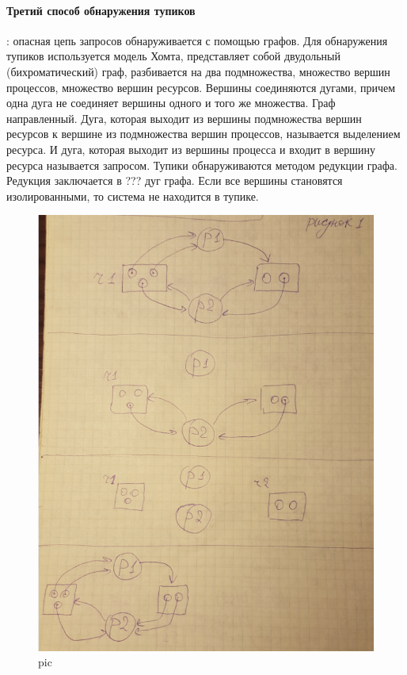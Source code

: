 \paragraph{Третий способ обнаружения тупиков}: опасная цепь запросов обнаруживается с помощью графов. Для обнаружения тупиков используется модель Хомта, представляет собой двудольный (бихроматический) граф, разбивается на два подмножества, множество вершин процессов, множество вершин ресурсов. Вершины соединяются дугами, причем одна дуга не соединяет вершины одного и того же множества. Граф направленный. Дуга, которая выходит из вершины подмножества вершин ресурсов к вершине из подмножества вершин процессов, называется выделением ресурса. И дуга, которая выходит из вершины процесса и входит в вершину ресурса называется запросом. Тупики обнаруживаются методом редукции графа. Редукция заключается в ??? дуг графа. Если все вершины становятся изолированными, то система не находится в тупике.

\begin{figure}[H]
    \centering
    \includegraphics[width=\textwidth]{pic/1.png}
    \caption{pic}
    \label{pic:graph_tupik}
\end{figure}

